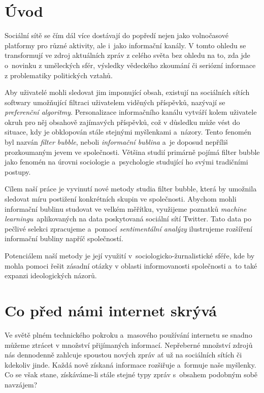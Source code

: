 \documentclass[12pt, a4paper]{article}
\numberwithin{equation}{section} 	%
\begin{document}

\newpage
\section*{Úvod}
\noindent Sociální sítě se čím dál více dostávají do popředí nejen jako volnočasové platformy pro různé aktivity, ale i~jako informační kanály. V tomto ohledu se transformují ve zdroj aktuálních zpráv z celého světa bez ohledu na to, zda jde o~novinku z uměleckých sfér, výsledky vědeckého zkoumání či seriózní informace z problematiky politických vztahů.

Aby uživatelé mohli sledovat jim imponující obsah, existují na sociálních sítích softwary umožňující filtraci uživatelem viděných příspěvků, nazývají se \textit{preferenční algoritmy}. Personalizace informačního kanálu vytváří kolem uživatele okruh pro něj obsahově zajímavých příspěvků, což v důsledku může vést do situace, kdy je obklopován stále stejnými myšlenkami a~názory. Tento fenomén byl nazván \textit{filter bubble}, neboli \textit{informační bublina} a~je doposud nepříliš prozkoumaným jevem ve společnosti. Většina studií primárně pojímá filter bubble jako fenomén na úrovni sociologie a~psychologie studující ho svými tradičními postupy.

Cílem naší práce je vyvinutí nové metody studia filter bubble, která by u\-mož\-ni\-la sledovat míru postižení konkrétních skupin ve společnosti. Abychom mohli informační bublinu studovat ve velkém měřítku, využijeme poznatků \textit{machine learningu}~aplikovaných na data poskytovaná sociální sítí Twitter. Tato data po pečlivé selekci zpracujeme a~pomocí \textit{sentimentální analýzy} ilustrujeme rozšíření informační bubliny napříč společností.

Potenciálem naší metody je její využití v sociologicko-žurnalistické sféře, kde by mohla pomoci řešit zásadní otázky v oblasti informovanosti společnosti a~to také expanzi ideologických názorů.

\newpage
\section{Co před námi internet skrývá}
\noindent  Ve světě plném technického pokroku a~masového používání internetu se snadno můžeme ztrácet v množství přijímaných informací. Nepřeberné množství zdrojů nás dennodenně zahlcuje spoustou nových zpráv ať už na sociálních sítích či kdekoliv jinde. Každá nově získaná informace rozšiřuje a~formuje naše myšlenky. Co se však stane, získáváme-li stále stejné typy zpráv s obsahem podobným sobě navzájem?
\end{document}
